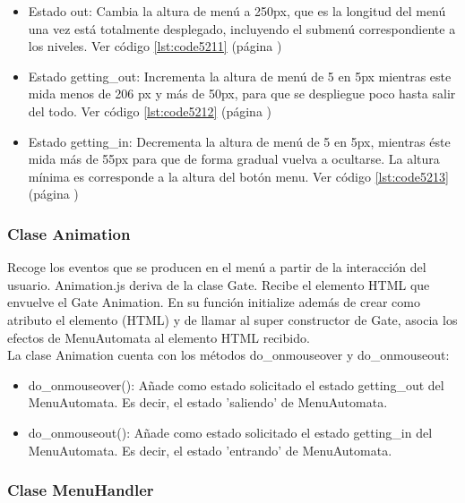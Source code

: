 \begin{itemize}
 \item Estado out: Cambia la altura de menú a 250px, que es la longitud del menú una vez está totalmente desplegado, incluyendo el submenú correspondiente a los 
 niveles. Ver código \ref{lst:code5211} (página \pageref{lst:code5211})

 \item Estado getting\_out: Incrementa la altura de menú de 5 en 5px  mientras este mida menos de 206 px y más de 50px, para que se despliegue poco hasta salir del todo.
 Ver código \ref{lst:code5212} (página \pageref{lst:code5212})

 \item Estado getting\_in: Decrementa la altura de menú de 5 en 5px, mientras éste mida  más de 55px para que de forma gradual vuelva a ocultarse. 
 La altura mínima es corresponde a la altura del botón menu. Ver código \ref{lst:code5213} (página \pageref{lst:code5213})
\end{itemize}


\subsubsection{Clase Animation}
\label{subsubsection:animation}

Recoge los eventos que se producen en el menú a partir de la interacción del usuario. Animation.js deriva de la clase Gate.
Recibe el elemento HTML que envuelve  el Gate Animation. En su función initialize además de crear como atributo  el elemento (HTML) y de llamar
al super constructor de Gate, asocia los efectos de MenuAutomata al elemento HTML recibido.\\

La clase Animation cuenta con los métodos do\_onmouseover y do\_onmouseout:
\begin{itemize}
 \item do\_onmouseover(): Añade como estado solicitado el estado getting\_out del MenuAutomata.
Es decir, el estado 'saliendo' de MenuAutomata.

 \item do\_onmouseout(): Añade como estado solicitado el estado getting\_in del MenuAutomata.
Es decir, el estado 'entrando' de MenuAutomata.
\end{itemize}

\subsubsection{Clase MenuHandler}
\label{subsubsection:menu_handler}

